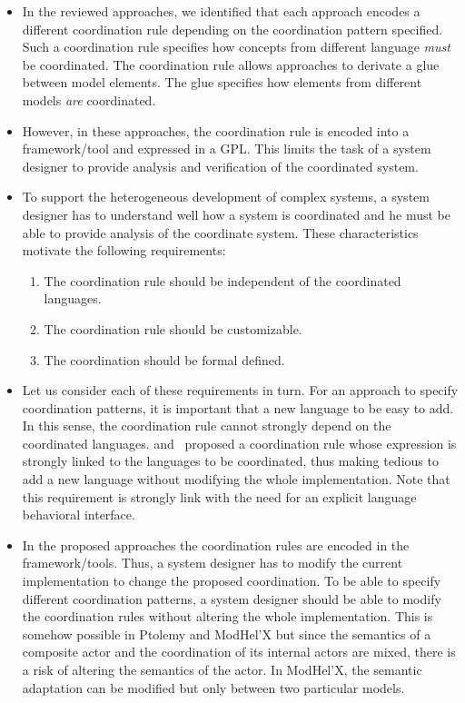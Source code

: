 \begin{itemize}
	\item In the reviewed approaches, we identified that each approach encodes a different coordination rule depending on the coordination pattern specified. Such a coordination rule specifies how concepts from different language \emph{must} be coordinated. The coordination rule allows approaches to derivate a glue between model elements. The glue specifies how elements from different models \emph{are} coordinated.   

	\item However, in these approaches, the coordination rule is encoded into a framework/tool and expressed in a GPL. This limits the task of a system designer to provide analysis and verification of the coordinated system. 
	
	\item To support the heterogeneous development of complex systems, a system designer has to understand well how a system is coordinated and he must be able to provide analysis of the coordinate system. These characteristics motivate the following requirements:
	
	\begin{enumerate}
		\item The coordination rule should be independent of the coordinated languages. 
		\item The coordination rule should be customizable. 
		\item The coordination should be formal defined. 
	\end{enumerate}
	
	\item Let us consider each of these requirements in turn. For an approach to specify coordination patterns, it is important that a new language to be easy to add. In this sense, the coordination rule cannot strongly depend on the coordinated languages. \cite{dinatale} and~\cite{mascotbib} proposed a coordination rule whose expression is strongly linked to the languages to be coordinated, thus making tedious to add a new language without modifying the whole implementation. Note that this requirement is strongly link with the need for an explicit language behavioral interface.
	
	\item In the proposed approaches the coordination rules are encoded in the framework/tools. Thus, a system designer has to modify the current implementation to change the proposed coordination. To be able to specify different coordination patterns, a system designer should be able to modify the coordination rules without altering the whole implementation. This is somehow possible in Ptolemy and ModHel'X but since the semantics of a composite actor and the coordination of its internal actors are mixed, there is a risk of altering the semantics of the actor. In ModHel'X, the semantic adaptation can be modified but only between two particular models.
	

\end{itemize}
